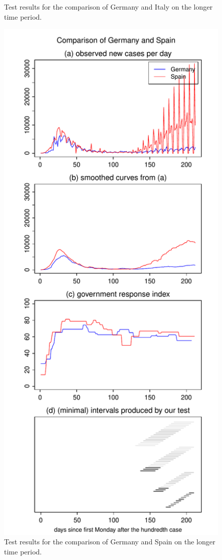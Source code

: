 \documentclass[a4paper,12pt]{article}
\numberwithin{equation}{section}
\begin{document}
\begin{figure}[h!]
\begin{minipage}[t]{0.49\textwidth}
\caption{Test results for the comparison of Germany and Italy on the longer time period.}\label{fig:supp3:first}
\end{minipage}
\hspace{0.25cm}
\begin{minipage}[t]{0.49\textwidth}
\includegraphics[width=\textwidth]{plots/DEU_vs_ESP_long}
\caption{Test results for the comparison of Germany and Spain on the longer time period.}
\end{minipage}
\end{figure}
\end{document}
